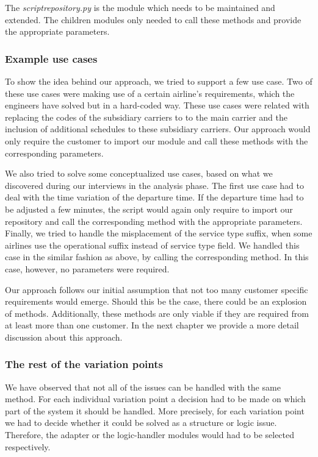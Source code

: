 The \textit{script\textunderscore repository.py} is the module which needs to be maintained and extended. The children modules only needed to call these methods and provide the appropriate parameters. 

\subsubsection{Example use cases}
To show the idea behind our approach, we tried to support a few use case. Two of these use cases were making use of a certain airline's requirements, which the engineers have solved but in a hard-coded way. These use cases were related with replacing the codes of the subsidiary carriers to to the main carrier and the inclusion of additional schedules to these subsidiary carriers. Our approach would only require the customer to import our module and call these methods with the corresponding parameters.

We also tried to solve some conceptualized use cases, based on what we discovered during our interviews in the analysis phase.
The first use case had to deal with the time variation of the departure time. If the departure time had to be adjusted a few minutes, the script would again only require to import our repository and call the corresponding method with the appropriate parameters. 
Finally, we tried to handle the misplacement of the service type suffix, when some airlines use the operational suffix instead of service type field. We handled this case in the similar fashion as above, by calling the corresponding method. In this case, however, no parameters were required.

Our approach follows our initial assumption that not too many customer specific requirements would emerge. Should this be the case, there could be an explosion of methods. Additionally, these methods are only viable if they are required from at least more than one customer. In the next chapter we provide a more detail discussion about this approach. 


\subsubsection{The rest of the variation points} 
We have observed that not all of the issues can be handled with the same method. For each individual variation point a decision had to be made on which part of the system it should be handled. More precisely, for each variation point we had to decide whether it could be solved as a structure or logic issue. Therefore, the adapter or the logic-handler modules would had to be selected respectively. 

